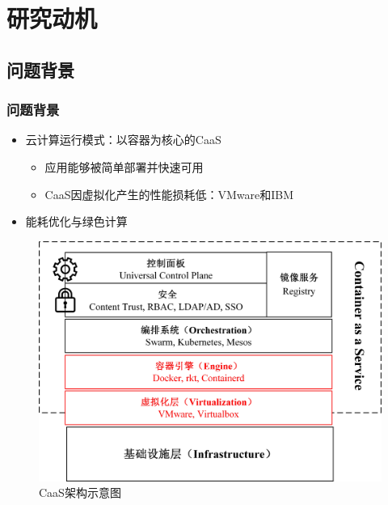 \section{研究动机}

\subsection{问题背景}
\begin{frame}
\frametitle{问题背景}
\begin{itemize}
    \item 云计算运行模式：以容器为核心的CaaS
    \begin{itemize}
        \item 应用能够被简单部署并快速可用
        \item CaaS因虚拟化产生的性能损耗低：VMware和IBM
    \end{itemize}
    \item 能耗优化与绿色计算
\end{itemize}
\begin{figure}[htb]
    \centering
    \includegraphics[scale=0.5]{figures/fig2_caas.jpg}
    \caption{CaaS架构示意图}
    \label{fig:fig2}
\end{figure}
\end{frame}
